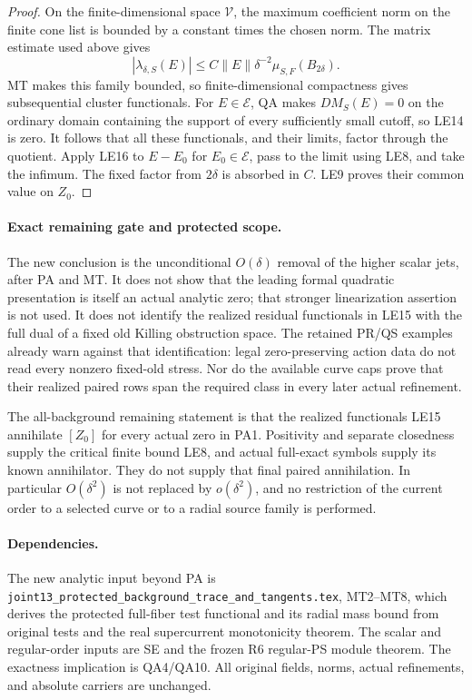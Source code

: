 \begin{proof}
On the finite-dimensional space $\mathcal V$, the maximum
coefficient norm on the finite cone list is bounded by a
constant times the chosen norm.  The matrix estimate used
above gives
\[
        |\lambda_{\delta,S}(E)|
          \le C\|E\|\delta^{-2}\mu_{S,F}(B_{2\delta}).
 \tag{LE16}
\]
MT makes this family bounded, so finite-dimensional compactness
gives subsequential cluster functionals.  For $E\in\mathcal E$,
QA makes $D M_S(E)=0$ on the ordinary domain containing
the support of every sufficiently small cutoff, so LE14 is
zero.  It follows that all these functionals, and their limits,
factor through the quotient.  Apply LE16 to $E-E_0$ for
$E_0\in\mathcal E$, pass to the limit using LE8, and take
the infimum.  The fixed factor from $2\delta$ is absorbed
in $C$.  LE9 proves their common value on $Z_0$.
\end{proof}

\paragraph{Exact remaining gate and protected scope.}
The new conclusion is the unconditional $O(\delta)$ removal
of the higher scalar jets, after PA and MT.  It does not
show that the leading formal quadratic presentation is itself
an actual analytic zero; that stronger linearization assertion
is not used.  It does not identify the realized residual
functionals in LE15 with the full dual of a fixed old Killing
obstruction space.  The retained PR/QS examples already warn
against that identification: legal zero-preserving action data
do not read every nonzero fixed-old stress.  Nor do the available
curve caps prove that their realized paired rows span the
required class in every later actual refinement.

The all-background remaining statement is that the realized
functionals LE15 annihilate $[Z_0]$ for every actual zero in
PA1.  Positivity and separate closedness supply the critical
finite bound LE8, and actual full-exact symbols supply its
known annihilator.  They do not supply that final paired
annihilation.  In particular $O(\delta^2)$ is not replaced
by $o(\delta^2)$, and no restriction of the current order to
a selected curve or to a radial source family is performed.

\paragraph{Dependencies.}
The new analytic input beyond PA is
\texttt{joint13\_protected\_background\_trace\_and\_tangents.tex},
MT2--MT8, which derives the protected full-fiber test functional
and its radial mass bound from original tests and the real
supercurrent monotonicity theorem.  The scalar and regular-order
inputs are SE and the frozen R6 regular-PS module theorem.
The exactness implication is QA4/QA10.  All original fields,
norms, actual refinements, and absolute carriers are unchanged.
